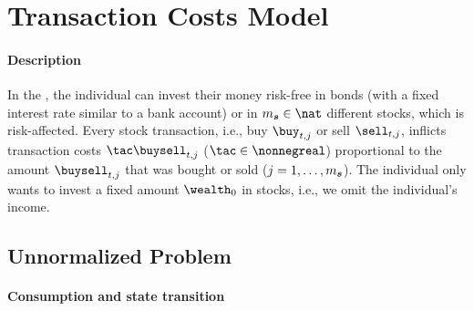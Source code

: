 \section{Transaction Costs Model}
\label{sec:83problem}


\vspace{-1.5em}

\paragraph{Description}

In the  \cite{Schober18Solving},
the individual can invest their money risk-free in bonds
(with a fixed interest rate similar to a bank account)
or in $m_{\vstock} \in \nat$ different stocks, which is risk-affected.
Every stock transaction,
i.e., buy $\buy_{t,j}$ or sell $\sell_{t,j}$,
inflicts transaction costs $\tac \buysell_{t,j}$ ($\tac \in \nonnegreal$)
proportional to the amount $\buysell_{t,j}$ that was bought or sold
($j = 1, \dotsc, m_{{\boldsymbol{s}}}$).
The individual only wants to invest a fixed
amount $\wealth_0$ in stocks, i.e., we omit the individual's income.



\subsection{Unnormalized Problem}
\label{sec:831unnormalized}

\paragraph{Consumption and state transition}

